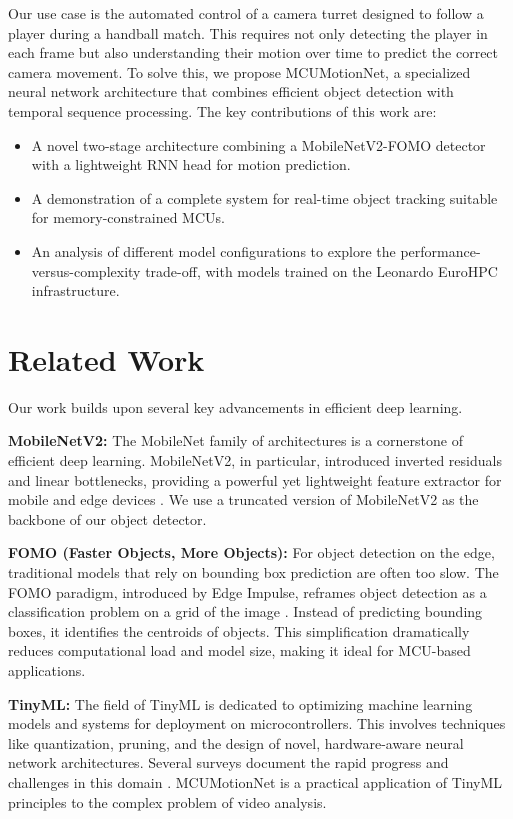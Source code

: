 \documentclass{article}
\begin{document}
Our use case is the automated control of a camera turret designed to follow a player during a handball match. This requires not only detecting the player in each frame but also understanding their motion over time to predict the correct camera movement. To solve this, we propose MCUMotionNet, a specialized neural network architecture that combines efficient object detection with temporal sequence processing. The key contributions of this work are:
\begin{itemize}
    \item A novel two-stage architecture combining a MobileNetV2-FOMO detector with a lightweight RNN head for motion prediction.
    \item A demonstration of a complete system for real-time object tracking suitable for memory-constrained MCUs.
    \item An analysis of different model configurations to explore the performance-versus-complexity trade-off, with models trained on the Leonardo EuroHPC infrastructure.
\end{itemize}

\section{Related Work}
Our work builds upon several key advancements in efficient deep learning.

\textbf{MobileNetV2:} The MobileNet family of architectures is a cornerstone of efficient deep learning. MobileNetV2, in particular, introduced inverted residuals and linear bottlenecks, providing a powerful yet lightweight feature extractor for mobile and edge devices \cite{mobilenetv2}. We use a truncated version of MobileNetV2 as the backbone of our object detector.

\textbf{FOMO (Faster Objects, More Objects):} For object detection on the edge, traditional models that rely on bounding box prediction are often too slow. The FOMO paradigm, introduced by Edge Impulse, reframes object detection as a classification problem on a grid of the image \cite{fomo_edgeimpulse}. Instead of predicting bounding boxes, it identifies the centroids of objects. This simplification dramatically reduces computational load and model size, making it ideal for MCU-based applications.

\textbf{TinyML:} The field of TinyML is dedicated to optimizing machine learning models and systems for deployment on microcontrollers. This involves techniques like quantization, pruning, and the design of novel, hardware-aware neural network architectures. Several surveys document the rapid progress and challenges in this domain \cite{tinyml_survey_1, tinyml_survey_2}. MCUMotionNet is a practical application of TinyML principles to the complex problem of video analysis.
\end{document}

